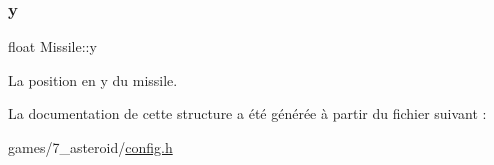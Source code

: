 \subsubsection{\texorpdfstring{y}{y}}
{\footnotesize\ttfamily float Missile\+::y}



La position en y du missile. 



La documentation de cette structure a été générée à partir du fichier suivant \+:\begin{DoxyCompactItemize}
\item 
games/7\+\_\+asteroid/\hyperlink{7__asteroid_2config_8h}{config.\+h}\end{DoxyCompactItemize}
